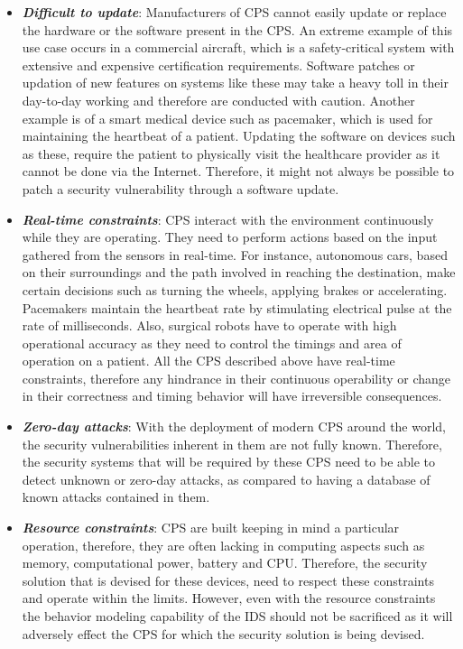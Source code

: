 \begin{itemize}
\item  \textbf{\textit{Difficult to update}}: Manufacturers of \ac{CPS} cannot easily update or replace the hardware or the software present in the \ac{CPS}. An extreme example of this use case occurs in a commercial aircraft, which is a safety-critical system with extensive and expensive certification requirements. Software patches or updation of new features on systems like these may take a heavy toll in their day-to-day working and therefore are conducted with caution. Another example is of a smart medical device such as pacemaker, which is used for maintaining the heartbeat of a patient. Updating the software on devices such as these, require the patient to physically visit the healthcare provider as it cannot be done via the Internet. Therefore, it might not always be possible to patch a security vulnerability through a software update.

\item \textbf{\textit{Real-time constraints}}: \ac{CPS} interact with the environment continuously while they are operating. They need to perform actions based on the input gathered from the sensors in real-time. For instance, autonomous cars, based on their surroundings and the path involved in reaching the destination, make certain decisions such as turning the wheels, applying brakes or accelerating. Pacemakers maintain the heartbeat rate by stimulating electrical pulse at the rate of milliseconds. Also, surgical robots have to operate with high operational accuracy as they need to control the timings and area of operation on a patient. All the \ac{CPS} described above have real-time constraints, therefore any hindrance in their continuous operability or change in their correctness and timing behavior will have irreversible consequences.

\item \textbf{\textit{Zero-day attacks}}: With the deployment of modern \ac{CPS} around the world, the security vulnerabilities inherent in them are not fully known. Therefore, the security systems that will be required by these \ac{CPS} need to be able to detect unknown or zero-day attacks, as compared to having a database of known attacks contained in them.

\item \textbf{\textit{Resource constraints}}: \ac{CPS} are built keeping in mind a particular operation, therefore, they are often lacking in computing aspects such as memory, computational power, battery and CPU. Therefore, the security solution that is devised for these devices, need to respect these constraints and operate within the limits. However, even with the resource constraints the behavior modeling capability of the \ac{IDS} should not be sacrificed as it will adversely effect the \ac{CPS} for which the security solution is being devised.


\end{itemize}
